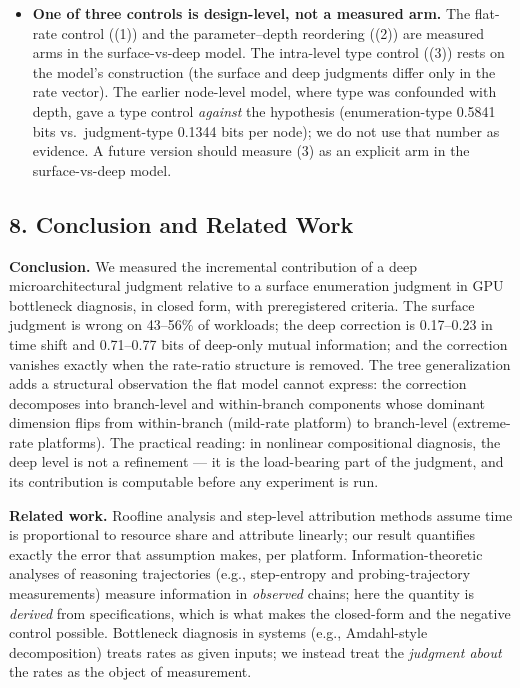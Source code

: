 \documentclass[11pt]{article}
\begin{document}
{{{{\begin{itemize}
\item
  \textbf{One of three controls is design-level, not a measured arm.} The flat-rate control ((1)) and the parameter--depth reordering ((2)) are measured arms in the surface-vs-deep model. The intra-level type control ((3)) rests on the model's construction (the surface and deep judgments differ only in the rate vector). The earlier node-level model, where type was confounded with depth, gave a type control \emph{against} the hypothesis (enumeration-type 0.5841 bits vs.~judgment-type 0.1344 bits per node); we do not use that number as evidence. A future version should measure (3) as an explicit arm in the surface-vs-deep model.
\end{itemize}

\subsection{8. Conclusion and Related Work}\label{conclusion-and-related-work}

\textbf{Conclusion.} We measured the incremental contribution of a deep microarchitectural judgment relative to a surface enumeration judgment in GPU bottleneck diagnosis, in closed form, with preregistered criteria. The surface judgment is wrong on 43--56\% of workloads; the deep correction is 0.17--0.23 in time shift and 0.71--0.77 bits of deep-only mutual information; and the correction vanishes exactly when the rate-ratio structure is removed. The tree generalization adds a structural observation the flat model cannot express: the correction decomposes into branch-level and within-branch components whose dominant dimension flips from within-branch (mild-rate platform) to branch-level (extreme-rate platforms). The practical reading: in nonlinear compositional diagnosis, the deep level is not a refinement --- it is the load-bearing part of the judgment, and its contribution is computable before any experiment is run.

\textbf{Related work.} Roofline analysis and step-level attribution methods assume time is proportional to resource share and attribute linearly; our result quantifies exactly the error that assumption makes, per platform. Information-theoretic analyses of reasoning trajectories (e.g., step-entropy and probing-trajectory measurements) measure information in \emph{observed} chains; here the quantity is \emph{derived} from specifications, which is what makes the closed-form and the negative control possible. Bottleneck diagnosis in systems (e.g., Amdahl-style decomposition) treats rates as given inputs; we instead treat the \emph{judgment about} the rates as the object of measurement.

}}}}
\end{document}
